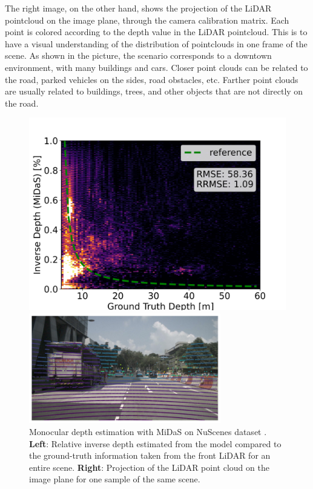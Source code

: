 The right image, on the other hand, 
shows the projection of the LiDAR pointcloud on the image plane, through the 
camera calibration matrix. Each point is colored according to the depth value 
in the LiDAR pointcloud. This is to have a visual understanding of the distribution 
of pointclouds in one frame of the scene. As shown in the picture, the scenario 
corresponds to a downtown environment, with many buildings and cars. 
Closer point clouds can be related to the road, parked vehicles on the sides, 
road obstacles, etc. Farther point clouds are usually related to buildings, 
trees, and other objects that are not directly on the road.
\begin{figure}
    \centering
    \begin{minipage}{0.52\textwidth}
        \centering
        \includegraphics[width=\textwidth]{images/nuscenes/depth_0.png} %
    \end{minipage}\hfill
    \begin{minipage}{0.47\textwidth}
        \centering
        \includegraphics[width=\textwidth, height=4.8cm]{images/nuscenes/lidar_over_img.png} %
    \end{minipage}
    \caption[Monocular depth estimation with MiDaS on NuScenes dataset.]
    {Monocular depth estimation with MiDaS on NuScenes dataset \cite{nuscenes}.
    \textbf{Left}: Relative inverse depth estimated from the model compared to 
    the ground-truth information taken from the front LiDAR for an entire scene.
    \textbf{Right}: Projection of the LiDAR point cloud on the image plane for
    one sample of the same scene.} 
    \label{fig:mde}
\end{figure}

